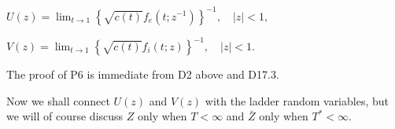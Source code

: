 $U(z) = \lim_{t \to 1} \left\{ \sqrt{c(t)} f_e(t; z^{-1}) \right\}^{-1}, \quad |z| < 1,$

$V(z) = \lim_{t \to 1} \left\{ \sqrt{c(t)} f_i(t; z) \right\}^{-1}, \quad |z| < 1.$

The proof of P6 is immediate from D2 above and D17.3.

Now we shall connect $U(z)$ and $V(z)$ with the ladder random variables, but we will of course discuss $Z$ only when $T < \infty$ and $\bar{Z}$ only when $T^* < \infty$.